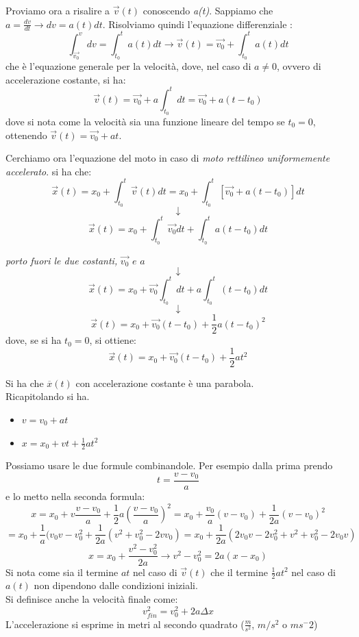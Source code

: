 \documentclass[a4paper,12pt, oneside]{book}
\begin{document}
\begin{shaded}
Proviamo ora a risalire a $\vec{v}(t)$ conoscendo \textit{a(t)}. Sappiamo che $a=\frac{dv}{dt}\rightarrow dv=a(t) dt$. Risolviamo quindi l'equazione differenziale :
$$\int_{\vec{v_0}}^v dv = \int_{t_0}^t a(t) dt\rightarrow \vec{v}(t)=\vec{v_0}+\int_{t_0}^t a(t) dt$$
che è l'equazione generale per la velocità, dove, nel caso di $a\neq 0$, ovvero di accelerazione costante, si ha:
$$\vec{v}(t)=\vec{v_0}+a\int_{t_0}^t dt=\vec{v_0}+a (t-t_0)$$
dove si nota come la velocità sia una funzione lineare del tempo se $t_0=0$, ottenendo $\vec{v}(t)=\vec{v_0}+a t$.
\end{shaded}
Cerchiamo ora l'equazione del moto in caso di\textit{ moto rettilineo uniformemente accelerato}.
si ha che: 
$$\vec{x}(t)=x_0+\int_{t_0}^t \vec{v}(t) dt= x_0+\int_{t_0}^t [\vec{v_0}+a (t-t_0)] dt$$
$$\downarrow$$
$$\vec{x}(t)=x_0+\int_{t_0}^t \vec{v_0} dt +\int_{t_0}^t a (t-t_0) dt$$
\begin{center}
\textit{porto fuori le due costanti, }$\vec{v_0}\,\, e\,\, a$
$$\downarrow$$
$$\vec{x}(t)=x_0+\vec{v_0} \int_{t_0}^t dt +a \int_{t_0}^t (t-t_0) dt$$
$$\downarrow$$
$$\vec{x}(t)=x_0+\vec{v_0} (t-t_0)+\frac{1}{2} a  (t-t_0)^2$$
dove, se si ha $t_0=0$, si ottiene:
$$\vec{x}(t)=x_0+\vec{v_0} (t-t_0)+\frac{1}{2} a  t^2$$
\end{center}
Si ha che $\overline{x}(t)$ con accelerazione costante è una parabola.\\
Ricapitolando si ha.
\begin{itemize}
\item $v=v_0+at$
\item $x=x_0+vt+\frac{1}{2}at^2$
\end{itemize}
Possiamo usare le due formule combinandole. Per esempio dalla prima prendo $$t=\frac{v-v_0}{a}$$ e lo metto nella seconda formula:
$$x=x_0+v\frac{v-v_0}{a}+\frac{1}{2}a \left(\frac{v-v_0}{a}\right)^2=x_0+\frac{v_0}{a}(v-v_0)+\frac{1}{2a}(v-v_0)^2$$
$$=x_0+\frac{1}{a}(v_0v-v_0^2+\frac{1}{2a}(v^2+v_0^2-2vv_0)=x_0+\frac{1}{2a}(2v_0v-2v_0^2+v^2+v_0^2-2v_0v)$$
$$x=x_0+\frac{v^2-v_0^2}{2a}\to v^2-v_0^2=2a(x-x_0)$$
Si nota come sia il termine $a t$ nel caso di $\vec{v}(t)$ che il termine $\frac{1}{2} a  t^2$ nel caso di $a(t)$ non dipendono dalle condizioni iniziali.\\
Si definisce anche la velocità finale come:
$$v_{fin}^2=v_0^2+2a\Delta x$$
L'accelerazione si esprime in metri al secondo quadrato ($\frac{m}{s^2}$, $m/s^2$ o $ms^-2$)
\end{document}

